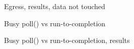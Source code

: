 \documentclass[aspectratio=169]{beamer}
\begin{document}
  \begin{frame}{Egress, results, data not touched}
  \end{frame}
  \begin{frame}{Busy poll() vs run-to-completion}
    \centering\resizebox{!}{0.9\textheight}{}
  \end{frame}
  \begin{frame}{Busy poll() vs run-to-completion, results}
  \end{frame}
\end{document}
